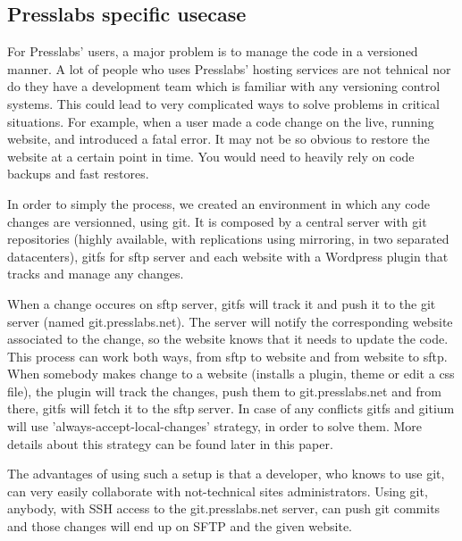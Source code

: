 \subsection{Presslabs specific usecase}
For Presslabs' users, a major problem is to manage the code in a versioned manner. A lot of people who uses Presslabs' hosting services are not tehnical nor do they have a development team which is familiar with any versioning control systems. This could lead to very complicated ways to solve problems in critical situations. For example, when a user made a code change on the live, running website, and introduced a fatal error. It may not be so obvious to restore the website at a certain point in time. You would need to heavily rely on code backups and fast restores.

In order to simply the process, we created an environment in which any code changes are versionned, using git. It is composed by a central server with git repositories (highly available, with replications using mirroring, in two separated datacenters), gitfs for sftp server and each website with a Wordpress plugin that tracks and manage any changes.

When a change occures on sftp server, gitfs will track it and push it to the git server (named git.presslabs.net). The server will notify the corresponding website associated to the change, so the website knows that it needs to update the code. This process can work both ways, from sftp to website and from website to sftp. When somebody makes change to a website (installs a plugin, theme or edit a css file), the plugin will track the changes, push them to git.presslabs.net and from there, gitfs will fetch it to the sftp server. In case of any conflicts gitfs and gitium will use 'always-accept-local-changes' strategy, in order to solve them. More details about this strategy can be found later in this paper.

The advantages of using such a setup is that a developer, who knows to use git, can very easily collaborate with not-technical sites administrators. Using git, anybody, with SSH access to the git.presslabs.net server, can push git commits and those changes will end up on SFTP and the given website.